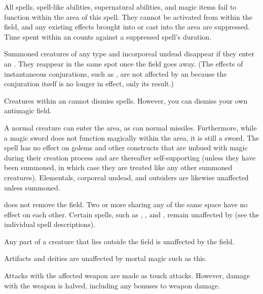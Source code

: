 \begin{spelleffect}
  All spells, spell-like abilities, supernatural abilities, and magic items fail to function within the area of this spell. They cannot be activated from within the field, and any existing effects brought into or cast into the area are suppressed. Time spent within an  counts against a suppressed spell's duration.
  \par Summoned creatures of any type and incorporeal undead disappear if they enter an . They reappear in the same spot once the field goes away. (The effects of instantaneous conjurations, such as , are not affected by an  because the conjuration itself is no longer in effect, only its result.)
  \par Creatures within an  cannot dismiss spells. However, you can dismiss your own antimagic field.
\end{spelleffect}
\begin{spellnotes}
  A normal creature can enter the area, as can normal missiles. Furthermore, while a magic sword does not function magically within the area, it is still a sword. The spell has no effect on golems and other constructs that are imbued with magic during their creation process and are thereafter self-supporting (unless they have been summoned, in which case they are treated like any other summoned creatures). Elementals, corporeal undead, and outsiders are likewise unaffected unless summoned.
  \par {} does not remove the field. Two or more  sharing any of the same space have no effect on each other. Certain spells, such as , , and , remain unaffected by  (see the individual spell descriptions).
  \par Any part of a creature that lies outside the field is unaffected by the field.
  \par Artifacts and deities are unaffected by mortal magic such as this. 
\end{spellnotes}

\spellrng{\rngclose}
\begin{spelleffect}
  Attacks with the affected weapon are made as touch attacks. However, damage with the weapon is halved, including any bonuses to weapon damage.
\end{spelleffect}

